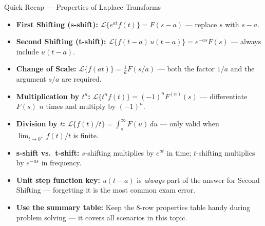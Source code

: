 \documentclass[12pt,a4paper]{article}
\begin{document}
\begin{learnbox}{Quick Recap --- Properties of Laplace Transforms}
\begin{itemize}
  \item \textbf{First Shifting (s-shift):}
        $\mathcal{L}\{e^{at}f(t)\} = F(s-a)$ --- replace $s$ with $s-a$.
  \item \textbf{Second Shifting (t-shift):}
        $\mathcal{L}\{f(t-a)\,u(t-a)\} = e^{-as}F(s)$ --- always include $u(t-a)$.
  \item \textbf{Change of Scale:}
        $\mathcal{L}\{f(at)\} = \tfrac{1}{a}F(s/a)$ --- both the factor $1/a$ and the argument
        $s/a$ are required.
  \item \textbf{Multiplication by $t^n$:}
        $\mathcal{L}\{t^n f(t)\} = (-1)^n F^{(n)}(s)$ --- differentiate $F(s)$ $n$ times and
        multiply by $(-1)^n$.
  \item \textbf{Division by $t$:}
        $\mathcal{L}\{f(t)/t\} = \int_s^\infty F(u)\,du$ --- only valid when
        $\lim_{t\to 0^+}f(t)/t$ is finite.
  \item \textbf{s-shift vs.~t-shift:} $s$-shifting multiplies by $e^{at}$ in time;
        $t$-shifting multiplies by $e^{-as}$ in frequency.
  \item \textbf{Unit step function key:} $u(t-a)$ is \emph{always} part of the answer for
        Second Shifting --- forgetting it is the most common exam error.
  \item \textbf{Use the summary table:} Keep the 8-row properties table handy during problem
        solving --- it covers all scenarios in this topic.
\end{itemize}
\end{learnbox}
\end{document}
